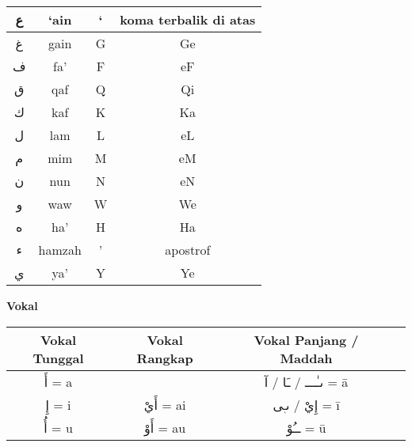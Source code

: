 {\begin{table}[h]
\begin{tabular}{|c|c|c|c|}
\textarabic{ع}        & `ain            & `                & koma terbalik di atas       \\[16pt] \hline
\textarabic{غ}        & gain            & G                & Ge                    \\[16pt] \hline
\textarabic{ف}        & fa'             & F                & eF                    \\[16pt] \hline
\textarabic{ق}        & qaf             & Q                & Qi                    \\[16pt] \hline
\textarabic{ك}        & kaf             & K                & Ka                    \\[16pt] \hline
\textarabic{ل}        & lam             & L                & eL                    \\[16pt] \hline
\textarabic{م}        & mim             & M                & eM                    \\[16pt] \hline
\textarabic{ن}        & nun             & N                & eN                    \\[16pt] \hline
\textarabic{و}        & waw             & W                & We                    \\[16pt] \hline
\textarabic{‫ه‬}        & ha'             & H                & Ha                    \\[16pt] \hline
\textarabic{ء}        & hamzah          & '                & apostrof              \\[16pt] \hline
\textarabic{ي}        & ya'             & Y                & Ye                    \\[16pt] \hline
\end{tabular}
\end{table}
}

\textbf{Vokal}

{\renewcommand{\arraystretch}{1.5}
\begin{table}[h]
\centering
\begin{tabular}{|c|c|c|c|}
\hline
\textbf{Vokal Tunggal} & \textbf{Vokal Rangkap} & \textbf{Vokal Panjang / Maddah} \\ \hline
\textarabic{أَ} = a     &                   &  \textarabic{ىـٰـــ / ـَا / آ} = \={a} \\ \hline
\textarabic{إِ} = i     & \textarabic{أَيْ} = ai  &  \textarabic{إِيْ / ىـٖى} = \={i}  \\ \hline
\textarabic{أُ} = u     & \textarabic{أَوْ} = au  &  \textarabic{ــُوْ} = \={u}  \\ \hline
\end{tabular}
\end{table}
}

